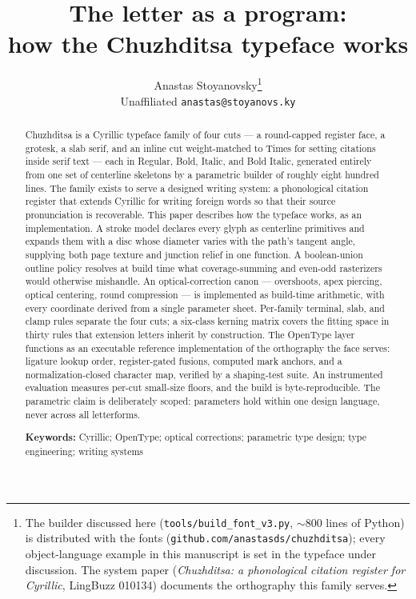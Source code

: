 \documentclass[12pt]{article}
\title{\textbf{The letter as a program:\\ how the Chuzhditsa typeface works}}
\author{Anastas Stoyanovsky\thanks{The builder discussed here (\texttt{tools/build\_font\_v3.py}, $\sim$800 lines of Python) is distributed with the fonts (\texttt{github.com/anastasds/chuzhditsa}); every object-language example in this manuscript is set in the typeface under discussion. The system paper (\emph{Chuzhditsa: a phonological citation register for Cyrillic}, LingBuzz 010134) documents the orthography this family serves.}\\[3pt] {\normalsize Unaffiliated \quad \texttt{anastas@stoyanovs.ky}}}
\date{}
\begin{document}
\maketitle
\onehalfspacing

\begin{abstract}
\noindent Chuzhditsa is a Cyrillic typeface family of four cuts — a round-capped register face, a grotesk, a slab serif, and an inline cut weight-matched to Times for setting citations inside serif text — each in Regular, Bold, Italic, and Bold Italic, generated entirely from one set of centerline skeletons by a parametric builder of roughly eight hundred lines. The family exists to serve a designed writing system: a phonological citation register that extends Cyrillic for writing foreign words so that their source pronunciation is recoverable. This paper describes how the typeface works, as an implementation. A stroke model declares every glyph as centerline primitives and expands them with a disc whose diameter varies with the path's tangent angle, supplying both page texture and junction relief in one function. A boolean-union outline policy resolves at build time what coverage-summing and even-odd rasterizers would otherwise mishandle. An optical-correction canon — overshoots, apex piercing, optical centering, round compression — is implemented as build-time arithmetic, with every coordinate derived from a single parameter sheet. Per-family terminal, slab, and clamp rules separate the four cuts; a six-class kerning matrix covers the fitting space in thirty rules that extension letters inherit by construction. The OpenType layer functions as an executable reference implementation of the orthography the face serves: ligature lookup order, register-gated fusions, computed mark anchors, and a normalization-closed character map, verified by a shaping-test suite. An instrumented evaluation measures per-cut small-size floors, and the build is byte-reproducible. The parametric claim is deliberately scoped: parameters hold within one design language, never across all letterforms.

\medskip
\noindent\textbf{Keywords:} Cyrillic; OpenType; optical corrections; parametric type design; type engineering; writing systems


\end{abstract}
\end{document}
